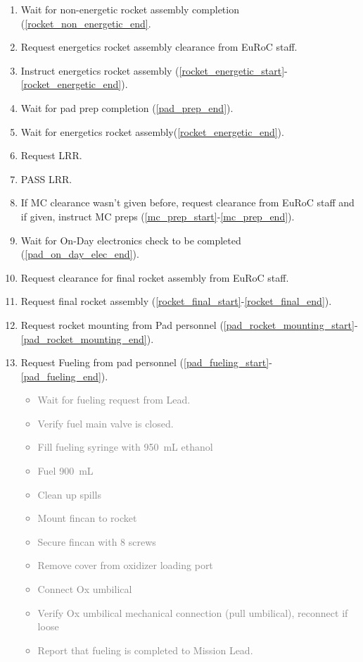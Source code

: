 \begin{enumerate}[label=L\arabic*.]
    
    \item Wait for non-energetic rocket assembly completion (\ref{rocket_non_energetic_end}.\checkbox
    \item Request energetics rocket assembly clearance from EuRoC staff.\checkbox
    \item Instruct energetics rocket assembly (\ref{rocket_energetic_start}-\ref{rocket_energetic_end}).\checkbox
    \item Wait for pad prep completion (\ref{pad_prep_end}).\checkbox
    \item Wait for energetics rocket assembly(\ref{rocket_energetic_end}).\checkbox
    \item Request LRR.\checkbox
    \item PASS LRR.\checkbox
    \item If MC clearance wasn't given before, request clearance from EuRoC staff and if given, instruct MC preps (\ref{mc_prep_start}-\ref{mc_prep_end}).\checkbox
    \item Wait for On-Day electronics check to be completed (\ref{pad_on_day_elec_end}).\checkbox
    \item Request clearance for final rocket assembly from EuRoC staff.\checkbox
    \item Request final rocket assembly (\ref{rocket_final_start}-\ref{rocket_final_end}).\checkbox
    \item Request rocket mounting from Pad personnel (\ref{pad_rocket_mounting_start}-\ref{pad_rocket_mounting_end}).\checkbox
    \item Request Fueling from pad personnel (\ref{pad_fueling_start}-\ref{pad_fueling_end}).\checkbox
    \textcolor{gray}{\begin{itemize}
        \item  Wait for fueling request from Lead.\leftcheckbox
        \item Verify fuel main valve is closed.\leftcheckbox
        \item Fill fueling syringe with \SI{950}{\milli\liter} ethanol\leftcheckbox
        \item Fuel \SI{900}{\milli\liter} \leftcheckbox
        \item Clean up spills\leftcheckbox
        \item Mount fincan to rocket\leftcheckbox
        \item Secure fincan with 8 screws\leftcheckbox
        \item Remove cover from oxidizer loading port\leftcheckbox
        \item Connect Ox umbilical\leftcheckbox
        \item Verify Ox umbilical mechanical connection (pull umbilical), reconnect if loose\leftcheckbox
        \item Report that fueling is completed to Mission Lead.\leftcheckbox
    \end{itemize}}
    

\end{enumerate}
